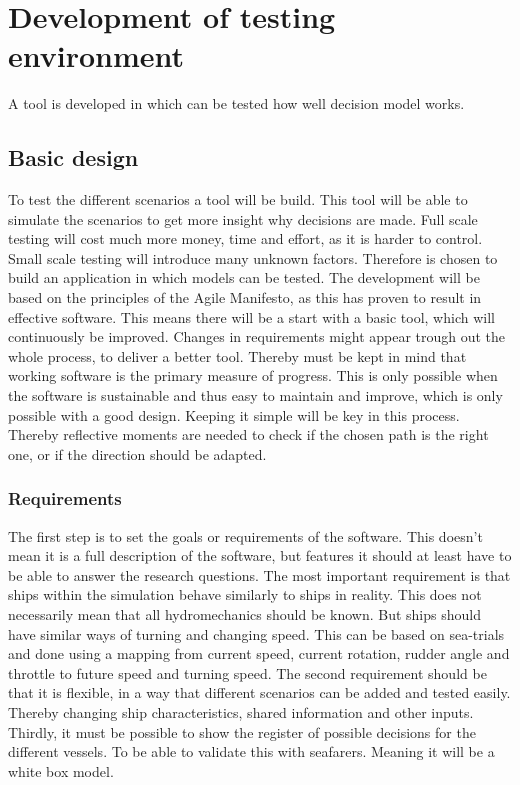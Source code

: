 \chapter{Development of testing environment}
A tool is developed in which can be tested how well decision model works.

\section{Basic design}
To test the different scenarios a tool will be build. This tool will be able to simulate the scenarios to get more insight why decisions are made. Full scale testing will cost much more money, time and effort, as it is harder to control. Small scale testing will introduce many unknown factors. Therefore is chosen to build an application in which models can be tested.
The development will be based on the principles of the Agile Manifesto, as this has proven to result in effective software. This means there will be a start with a basic tool, which will continuously be improved. Changes in requirements might appear trough out the whole process, to deliver a better tool. Thereby must be kept in mind that working software is the primary measure of progress. This is only possible when the software is sustainable and thus easy to maintain and improve, which is only possible with a good design. Keeping it simple will be key in this process. Thereby reflective moments are needed to check if the chosen path is the right one, or if the direction should be adapted. \cite{Agile2001}

\subsection{Requirements}
The first step is to set the goals or requirements of the software. This doesn't mean it is a full description of the software, but features it should at least have to be able to answer the research questions.
The most important requirement is that ships within the simulation behave similarly to ships in reality. This does not necessarily mean that all hydromechanics should be known. But ships should have similar ways of turning and changing speed. This can be based on sea-trials and done using a mapping from current speed, current rotation, rudder angle and throttle to future speed and turning speed.
The second requirement should be that it is flexible, in a way that different scenarios can be added and tested easily. Thereby changing ship characteristics, shared information and other inputs.
Thirdly, it must be possible to show the register of possible decisions for the different vessels. To be able to validate this with seafarers. Meaning it will be a white box model.

